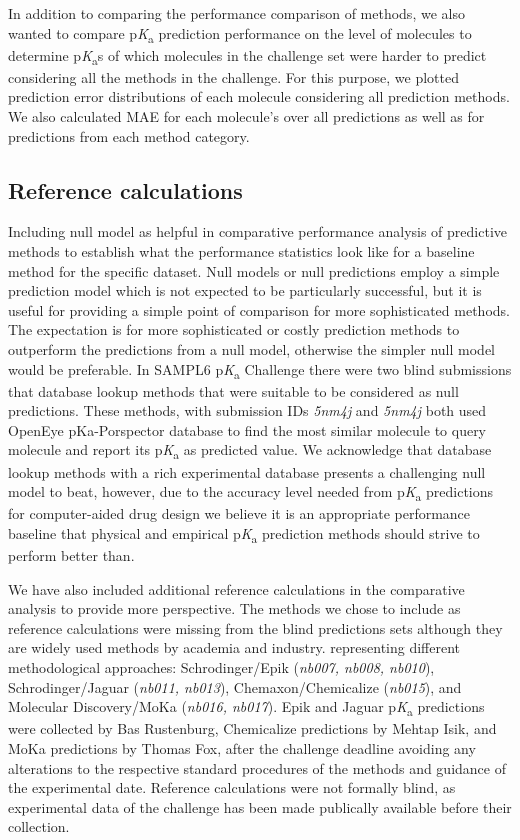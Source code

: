 \documentclass[9pt,lineno,final]{elife}
\newcommand{\pKa}{p\textit{K}\textsubscript{a}}
\begin{document}
In addition to comparing the performance comparison of methods, we also wanted to compare \pKa{} prediction performance on the level of molecules to determine \pKa{}s of which molecules in the challenge set were harder to predict considering all the methods in the challenge. 
For this purpose, we plotted prediction error distributions of each molecule considering all prediction methods. 
We also calculated MAE for each molecule’s over all predictions as well as for predictions from each method category. 


\subsection{Reference calculations}

Including null model as helpful in comparative performance analysis of predictive methods to establish what the performance statistics look like for a baseline method for the specific dataset. 
Null models or null predictions employ a simple prediction model which is not expected to be particularly successful, but it is useful for providing a simple point of comparison for more sophisticated methods. The expectation is for more sophisticated or costly prediction methods to outperform the predictions from a null model, otherwise the simpler null model would be preferable. In SAMPL6 \pKa{} Challenge there were two blind submissions that database lookup methods that were suitable to be considered as null predictions. These methods, with submission IDs \textit{5nm4j} and \textit{5nm4j} both used OpenEye pKa-Porspector database to find the most similar molecule to query molecule and report its \pKa{} as predicted value. 
We acknowledge that database lookup methods with a rich experimental database presents a challenging null model to beat, however, due to the accuracy level needed from \pKa{} predictions for computer-aided drug design we believe it is an appropriate performance baseline that physical and empirical \pKa{} prediction methods should strive to perform better than.

We have also included additional reference calculations in the comparative analysis to provide more perspective. 
The methods we chose to include as reference calculations were missing from the blind predictions sets although they are widely used methods by academia and industry.
representing different methodological approaches: Schrodinger/Epik (\textit{nb007, nb008, nb010}), Schrodinger/Jaguar (\textit{nb011, nb013}), Chemaxon/Chemicalize (\textit{nb015}), and Molecular Discovery/MoKa (\textit{nb016, nb017}). Epik and Jaguar \pKa{} predictions were collected by Bas Rustenburg, Chemicalize predictions by Mehtap Isik, and MoKa predictions by Thomas Fox, after the challenge deadline avoiding any alterations to the respective standard procedures of the methods and guidance of the experimental date. 
Reference calculations were not formally blind, as experimental data of the challenge has been made publically available before their collection. 
\end{document}
